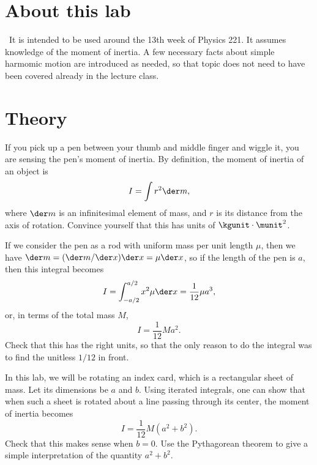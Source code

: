 \addtocounter{chapter}{-1}
\renewcommand\thechapter{c1.13a}
\label{lab:covid-moi}

\section*{About this lab}

\covid\ 
It is intended to be used around the 13th week of Physics 221.
It assumes knowledge of the moment of inertia. A few necessary facts about simple harmomic
motion are introduced as needed, so that topic does not need to have been covered already
in the lecture class.

\section*{Theory}
If you pick up a pen between your thumb and middle finger and wiggle it,
you are sensing the pen's moment of inertia. By definition, the moment of
inertia of an object is
\begin{equation}
  I = \int r^2 \der m,
\end{equation}
where $\der m$ is an infinitesimal element of mass, and $r$ is its distance
from the axis of rotation. Convince yourself that this has units of $\kgunit\cdot\munit^2$.

If we consider the pen as a rod with uniform mass per unit
length $\mu$, then we have $\der m=(\der m/\der x)\der x=\mu \der x$, so if the length of the pen is $a$, then this
integral becomes
\begin{equation}
  I = \int_{-a/2}^{a/2} x^2 \mu \der x = \frac{1}{12}\mu a^3,
\end{equation}
or, in terms of the total mass $M$,
\begin{equation}
  I = \frac{1}{12}Ma^2.
\end{equation}
Check that this has the right units, so that the only reason to do the integral was to find the unitless $1/12$ in front.

In this lab, we will be rotating an index card, which is a rectangular sheet of mass. Let its dimensions be $a$ and $b$.
Using iterated integrals, one can show that when such a sheet is rotated about a line passing through its center, the
moment of inertia becomes
\begin{equation}
  I = \frac{1}{12}M\left(a^2+b^2\right).
\end{equation}
Check that this makes sense when $b=0$. Use the Pythagorean theorem to give a simple interpretation
of the quantity $a^2+b^2$.

